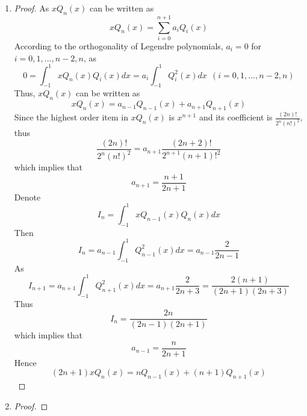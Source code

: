\documentclass[paper=a4, fontsize=11pt]{scrartcl} %
\numberwithin{equation}{section} %
\numberwithin{figure}{section} %
\numberwithin{table}{section} %
\begin{document}
\begin{enumerate}
		\item
			\begin{proof}
				As $xQ_n(x)$ can be written as
				\begin{equation}
					xQ_n(x) = \sum_{i=0}^{n+1} a_i Q_i(x)
				\end{equation}
				According to the orthogonality of Legendre polynomials, $a_i = 0$ for $i = 0, 1, ... , n-2, n$, as
				\begin{equation}
					0 = \int_{-1}^{1}xQ_n(x) Q_i(x) dx = a_i \int_{-1}^{1}Q_i^2(x)dx \ \ (i = 0, 1, ... , n-2, n)
				\end{equation}
				Thus,  $xQ_n(x)$ can be written as
				\begin{equation}
					xQ_n(x) = a_{n-1} Q_{n-1}(x) + a_{n+1} Q_{n+1}(x)
				\end{equation}
				Since the highest order item in $xQ_n(x)$ is $x^{n+1}$ and its coefficient is $\frac{(2n)!}{2^n (n!)^2}$, thus
				\begin{equation}
					\frac{(2n)!}{2^n (n!)^2} = a_{n+1} \frac{(2n+2)!}{2^{n+1} (n+1)!^2}
				\end{equation}
				which implies that
				\begin{equation}
					a_{n+1} = \frac{n+1}{2n+1} 
				\end{equation}
				Denote
				\begin{equation}
					I_n = \int_{-1}^{1} xQ_{n-1}(x)Q_{n}(x)dx
 				\end{equation}
 				Then
 				\begin{equation}
 					I_n = a_{n-1}\int_{-1}^{1} Q_{n-1}^2(x)dx = a_{n-1} \frac{2}{2n-1}
 				\end{equation}
 				As
 				\begin{equation}
 					I_{n+1} = a_{n+1}\int_{-1}^{1}Q_{n+1}^2(x)dx = a_{n+1} \frac{2}{2n+3} = \frac{2(n+1)}{(2n+1)(2n+3)}
 				\end{equation}
 				Thus
 				\begin{equation}
 					I_n = \frac{2n}{(2n-1)(2n+1)}
 				\end{equation}
 				which implies that
 				\begin{equation}
 					a_{n-1} = \frac{n}{2n+1}
 				\end{equation}
 				Hence
 				\begin{equation}
 					(2n+1)xQ_n(x) = nQ_{n-1}(x) + (n+1)Q_{n+1}(x)
 				\end{equation}
			\end{proof}
			
		\item
			\begin{proof}
				
			\end{proof}
	
	\end{enumerate}
\end{document}

